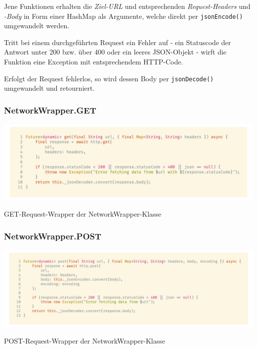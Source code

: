 Jene Funktionen erhalten die \textit{Ziel-URL} und entsprechenden \textit{Request-Headers} und \textit{-Body} in Form einer HashMap
als Argumente, welche direkt per \lstinline{jsonEncode()} umgewandelt werden.

Tritt bei einem durchgeführten Request ein Fehler auf - ein Statuscode der Antwort unter 200 bzw. über 400 oder ein
leeres JSON-Objekt - wirft die Funktion eine Exception mit entsprechendem HTTP-Code.

Erfolgt der Request fehlerlos, so wird dessen Body per \lstinline{jsonDecode()} umgewandelt und retourniert.

\subsubsection{NetworkWrapper.GET}

\begin{code}
    \centering
    \includegraphics[width=1\textwidth]{images/Client/util/network-wrapper/networkWrapperGET.png}
    \vspace{-25pt}
    \caption{GET-Request-Wrapper der NetworkWrapper-Klasse}
\end{code}

\subsubsection{NetworkWrapper.POST}

\begin{code}[H]
    \centering
    \includegraphics[width=1\textwidth]{images/Client/util/network-wrapper/networkWrapperPOST.png}
    \vspace{-25pt}
    \caption{POST-Request-Wrapper der NetworkWrapper-Klasse}
\end{code}